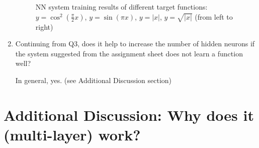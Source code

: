 \documentclass[12pt]{article}
\begin{document}
\begin{enumerate}
\begin{figure}[ht]
		\caption{NN system training results of different target functions: 
		$y=\cos^2(\frac{\pi}{2}x)$, $y=\sin(\pi x)$, $y=|x|$, $y=\sqrt{|x|}$ (from left to right) }
	\end{figure}
	\item Continuing from Q3, does it help to increase the number of hidden neurons if the system suggested from the assignment sheet 
		does not learn a function well?
		\begin{flushleft}
			In general, yes. (see Additional Discussion section)
		\end{flushleft}
\end{enumerate}

\newpage
\section*{Additional Discussion: Why does it (multi-layer) work?}
\vspace{-20pt}
\noindent\makebox[\linewidth]{\rule{\textwidth}{0.4pt}}
\end{document}

